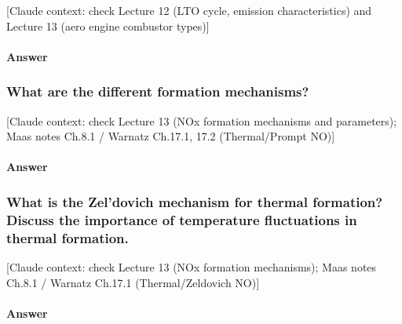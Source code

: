{\color{gray}\footnotesize [Claude context: check Lecture 12 (LTO cycle, emission characteristics) and Lecture 13 (aero engine combustor types)]}

\paragraph{Answer}




\subsubsection{What are the different  formation mechanisms?}

{\color{gray}\footnotesize [Claude context: check Lecture 13 (NOx formation mechanisms and parameters); Maas notes Ch.8.1 / Warnatz Ch.17.1, 17.2 (Thermal/Prompt NO)]}

\paragraph{Answer}




\subsubsection{What is the Zel'dovich mechanism for thermal  formation? Discuss the importance of temperature fluctuations in thermal  formation.}

{\color{gray}\footnotesize [Claude context: check Lecture 13 (NOx formation mechanisms); Maas notes Ch.8.1 / Warnatz Ch.17.1 (Thermal/Zeldovich NO)]}

\paragraph{Answer}



